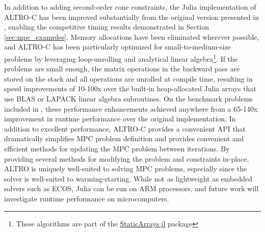 \documentclass[../root.tex]{subfiles}
\begin{document}
        In addition to adding second-order cone constraints, the Julia
        implementation of ALTRO-C has been improved substantially from the
        original version presented in \cite{howell_ALTRO_2019}, enabling the competitive
        timing results demonstrated in Section \ref{sec:mpc_examples}. Memory
        allocations have been eliminated wherever possible, and ALTRO-C has been
        particularly optimized for small-to-medium-size problems by leveraging
        loop-unrolling and analytical linear algebra\footnote{These algorithms
        are part of the
        \href{https://github.com/JuliaArrays/StaticArrays.jl}{StaticArrays.jl}
        package}.
        If the problems are small enough, the matrix operations in the
        backward pass are stored on the stack and all operations are unrolled
        at compile time, resulting in speed improvements of 10-100x over the
        built-in heap-allocated Julia arrays that use BLAS or LAPACK linear
        algebra subroutines. On the benchmark problems included in
        \cite{howell_ALTRO_2019}, these performance enhancements achieved
        anywhere from a 65-140x improvement in runtime performance over the
        original implementation.
        In addition to excellent performance, ALTRO-C provides a convenient API
        that dramatically simplifies MPC problem definition and provides
        convenient and efficient methods for updating the MPC problem between
        iterations. 
        By providing several methods for modifying the problem and
        constraints in-place, ALTRO is uniquely well-suited to solving MPC
        problems, especially since the solver is well-suited to warming-starting.
        While not as lightweight as embedded solvers such as ECOS, Julia can be
        run on ARM processors, and future work will investigate runtime performance
        on microcomputers.

        
\end{document}
